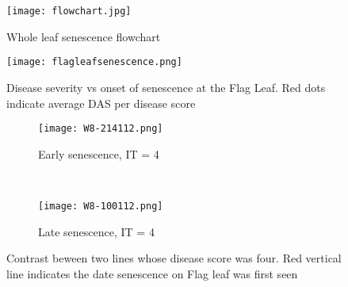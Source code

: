 \documentclass{frontiersSCNS} %
\begin{document}
\begin{figure}[h!]
\begin{center}
\texttt{[image: flowchart.jpg]}
\end{center}
 \caption{ Whole leaf senescence flowchart}\label{fig1:flowchart}
\end{figure}

\begin{figure}[h!]
\begin{center}
\texttt{[image: flagleafsenescence.png]}
\end{center}
 \caption{Disease severity vs onset of senescence at the Flag Leaf. Red dots indicate average DAS per disease score}\label{fig2}
\end{figure}


\begin{figure}
    \begin{center}
    \begin{subfigure}[b]{0.5\textwidth}
        \texttt{[image: W8-214112.png]}
        \caption{Early senescence, IT = 4}
    \end{subfigure}
    ~ %
    \begin{subfigure}[b]{0.5\textwidth}
        \texttt{[image: W8-100112.png]}
        \caption{Late senescence, IT = 4}
    \end{subfigure}
\end{center}
    \caption{Contrast beween two lines whose disease score was four. Red vertical line indicates the date senescence on Flag leaf was first seen}\label{fig3}
\end{figure}
\end{document}

